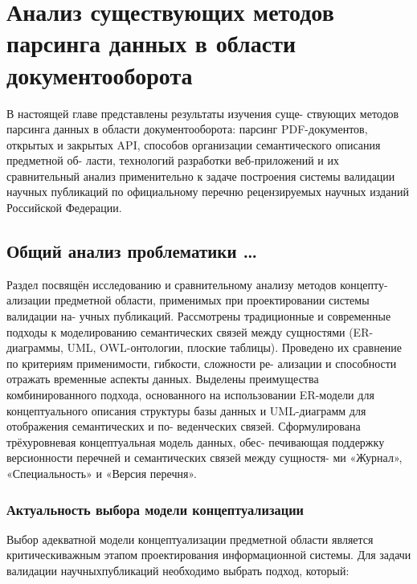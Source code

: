\chapter{Анализ существующих методов парсинга данных в
области документооборота}
\label{chapter1}

В настоящей главе представлены результаты изучения суще-
ствующих методов парсинга данных в области документооборота: парсинг PDF-документов,
открытых и закрытых API, способов организации семантического описания предметной об-
ласти, технологий разработки веб-приложений и их сравнительный анализ применительно
к задаче построения системы валидации научных публикаций по официальному перечню
рецензируемых научных изданий Российской Федерации.

\section{Общий анализ проблематики \dots}

\begin{annotation}
	Раздел посвящён исследованию и сравнительному анализу методов концепту-
	ализации предметной области, применимых при проектировании системы валидации на-
	учных публикаций. Рассмотрены традиционные и современные подходы к моделированию
	семантических связей между сущностями (ER-диаграммы, UML, OWL-онтологии, плоские
	таблицы). Проведено их сравнение по критериям применимости, гибкости, сложности ре-
	ализации и способности отражать временные аспекты данных. Выделены преимущества
	комбинированного подхода, основанного на использовании ER-модели для концептуального
	описания структуры базы данных и UML-диаграмм для отображения семантических и по-
	веденческих связей. Сформулирована трёхуровневая концептуальная модель данных, обес-
	печивающая поддержку версионности перечней и семантических связей между сущностя-
	ми «Журнал», «Специальность» и «Версия перечня».
\end{annotation}




\subsection{Актуальность выбора модели концептуализации}

Выбор адекватной модели концептуализации предметной области
является критическиважным этапом проектирования информационной системы.
Для задачи валидации научныхпубликаций необходимо выбрать подход, который:

